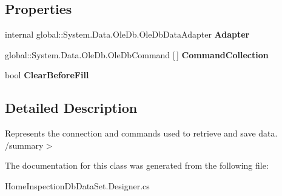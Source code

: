 \subsection*{Properties}
\begin{DoxyCompactItemize}
\item 
\mbox{\label{class_a_f_h___scheduler_1_1_home_inspection_db_data_set_table_adapters_1_1_provider_table_adapter_a78491b41eeaa5bda251d82b6473ee618}} 
internal global\+::\+System.\+Data.\+Ole\+Db.\+Ole\+Db\+Data\+Adapter {\bfseries Adapter}\hspace{0.3cm}{\ttfamily  [get]}
\item 
\mbox{\label{class_a_f_h___scheduler_1_1_home_inspection_db_data_set_table_adapters_1_1_provider_table_adapter_adae3c64e176e3f7093b0bb331cecda1c}} 
global\+::\+System.\+Data.\+Ole\+Db.\+Ole\+Db\+Command [$\,$] {\bfseries Command\+Collection}\hspace{0.3cm}{\ttfamily  [get]}
\item 
\mbox{\label{class_a_f_h___scheduler_1_1_home_inspection_db_data_set_table_adapters_1_1_provider_table_adapter_a5e4d15b30b24e89d1f182b5cc9b374ac}} 
bool {\bfseries Clear\+Before\+Fill}\hspace{0.3cm}{\ttfamily  [get, set]}
\end{DoxyCompactItemize}


\subsection{Detailed Description}
Represents the connection and commands used to retrieve and save data. /summary$>$ 

The documentation for this class was generated from the following file\+:\begin{DoxyCompactItemize}
\item 
Home\+Inspection\+Db\+Data\+Set.\+Designer.\+cs\end{DoxyCompactItemize}
